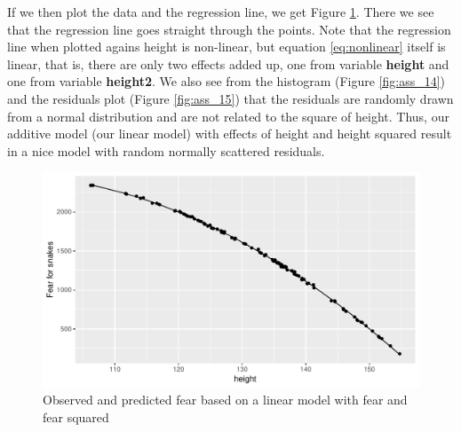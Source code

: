 \documentclass[]{report}\usepackage[]{graphicx}\usepackage[]{color}
\makeatletter
\def\maxwidth{ %
  \ifdim\Gin@nat@width>\linewidth
    \linewidth
  \else
    \Gin@nat@width
  \fi
}
\newenvironment{knitrout}{}{} %
\makeatother
\begin{document}
If we then plot the data and the regression line, we get Figure \ref{fig:ass_13}. There we see that the regression line goes straight through the points. Note that the regression line when plotted agains height is non-linear, but equation \ref{eq:nonlinear} itself is linear, that is, there are only two effects added up, one from variable \textbf{height} and one from variable \textbf{height2}. We also see from the histogram (Figure \ref{fig:ass_14}) and the residuals plot (Figure \ref{fig:ass_15}) that the residuals are randomly drawn from a normal distribution and are not related to the square of height. Thus, our additive model (our linear model) with effects of height and height squared result in a nice model with random normally scattered residuals. 

\begin{knitrout}
\color{fgcolor}\begin{figure}

{\centering \includegraphics[width=\maxwidth]{figure/ass_13-1} 

}

\caption[Observed and predicted fear based on a linear model with fear and fear squared]{Observed and predicted fear based on a linear model with fear and fear squared}\label{fig:ass_13}
\end{figure}


\end{knitrout}
\end{document}
